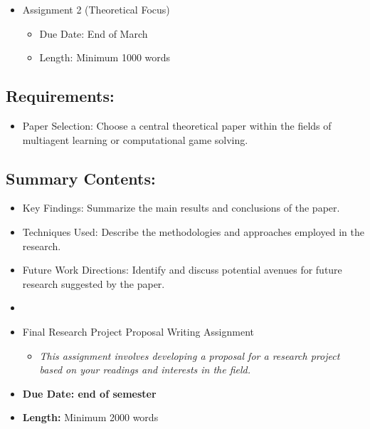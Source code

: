 \documentclass[
]{article}
\begin{document}
\begin{itemize}
\item
  Assignment 2 (Theoretical Focus)

  \begin{itemize}
  \item
    Due Date: End of March
  \item
    Length: Minimum 1000 words
  \end{itemize}
\end{itemize}

\subsection{Requirements:}\label{requirements-1}

\begin{itemize}
\item
  Paper Selection: Choose a central theoretical paper within the fields
  of multiagent learning or computational game solving.
\end{itemize}

\subsection{Summary Contents:}\label{summary-contents-1}

\begin{itemize}
\item
  Key Findings: Summarize the main results and conclusions of the paper.
\item
  Techniques Used: Describe the methodologies and approaches employed in
  the research.
\item
  Future Work Directions: Identify and discuss potential avenues for
  future research suggested by the paper.
\end{itemize}

\begin{itemize}
\item
\item
  Final Research Project Proposal Writing Assignment

  \begin{itemize}
  \item
    \emph{This assignment involves developing a proposal for a research
    project based on your readings and interests in the field.}
  \end{itemize}
\end{itemize}

\begin{itemize}
\item
  \textbf{Due Date: end of semester}
\item
  \textbf{Length:} Minimum 2000 words
\end{itemize}
\end{document}
